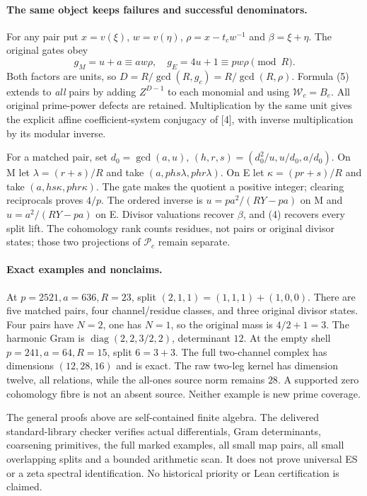 \documentclass[11pt,a4paper]{article}
\begin{document}
\paragraph{The same object keeps failures and successful denominators.}
For any pair put $x=v(\xi)$, $w=v(\eta)$, $\rho=x-t_cw^{-1}$ and
$\beta=\xi+\eta$. The original gates obey
\[
 g_M=u+a\equiv aw\rho,\quad g_E=4u+1\equiv pw\rho\pmod R.
\]
Both factors are units, so $D=R/\gcd(R,g_c)=R/\gcd(R,\rho)$.
Formula (5) extends to \emph{all} pairs by adding $Z^{D-1}$ to each
monomial and using $\mathscr W_c=B_e$. All original prime-power defects
are retained. Multiplication by the same unit gives the explicit affine
coefficient-system conjugacy of [4], with inverse multiplication by its
modular inverse.

For a matched pair, set $d_0=\gcd(a,u)$,
$(h,r,s)=(d_0^2/u,u/d_0,a/d_0)$. On M let
$\lambda=(r+s)/R$ and take $(a,phs\lambda,phr\lambda)$.
On E let $\kappa=(pr+s)/R$ and take $(a,hs\kappa,phr\kappa)$.
The gate makes the quotient a positive integer; clearing reciprocals
proves $4/p$. The ordered inverse is $u=pa^2/(RY-pa)$ on M and
$u=a^2/(RY-pa)$ on E. Divisor valuations recover $\beta$, and (4)
recovers every split lift. The cohomology rank counts residues, not pairs
or original divisor states; those two projections of $\mathscr P_c$
remain separate.

\paragraph{Exact examples and nonclaims.}
At $p=2521,a=636,R=23$, split $(2,1,1)=(1,1,1)+(1,0,0)$.
There are five matched pairs, four channel/residue classes, and three
original divisor states. Four pairs have $N=2$, one has $N=1$, so the
original mass is $4/2+1=3$. The harmonic Gram is
$\operatorname{diag}(2,2,3/2,2)$, determinant $12$.
At the empty shell $p=241,a=64,R=15$, split $6=3+3$.
The full two-channel complex has dimensions $(12,28,16)$ and is exact.
The raw two-leg kernel has dimension twelve, all relations, while the
all-ones source norm remains $28$. A supported zero cohomology fibre is
not an absent source. Neither example is new prime coverage.

The general proofs above are self-contained finite algebra. The delivered
standard-library checker verifies actual differentials, Gram determinants,
coarsening primitives, the full marked examples, all small map pairs,
all small overlapping splits and a bounded arithmetic scan. It does not
prove universal ES or a zeta spectral identification. No historical
priority or Lean certification is claimed.
\end{document}
